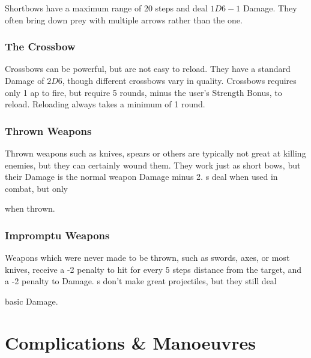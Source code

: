 \begin{multicols}{2}
Shortbows have a maximum range of 20 steps and deal $1D6-1$ Damage.
They often bring down prey with multiple arrows rather than the one.

\subsubsection{The Crossbow}
\label{crossbow}
Crossbows can be powerful, but are not easy to reload.
They have a standard Damage of $2D6$, though different crossbows vary in quality.
Crossbows requires only 1 \gls{ap} to fire, but require 5 rounds, minus the user's Strength Bonus, to reload.
Reloading always takes a minimum of 1 round.

\subsubsection{Thrown Weapons}

Thrown weapons such as knives, spears or others are typically not great at killing enemies, but they can certainly wound them.
They work just as short bows, but their Damage is the normal weapon Damage minus 2.
\javelin s deal  when used in combat, but only
\addtocounter{damage}{-2}%
 when thrown.

\subsubsection{Impromptu Weapons}

Weapons which were never made to be thrown, such as swords, axes, or most knives, receive a -2 penalty to hit for every 5 steps distance from the target, and a -2 penalty to Damage.
\longsword s don't make great projectiles, but they still deal
\addtocounter{damage}{-2}%
 basic Damage.

\end{multicols}

\startcontents[Manoeuvres]

\section{Complications \& Manoeuvres}

